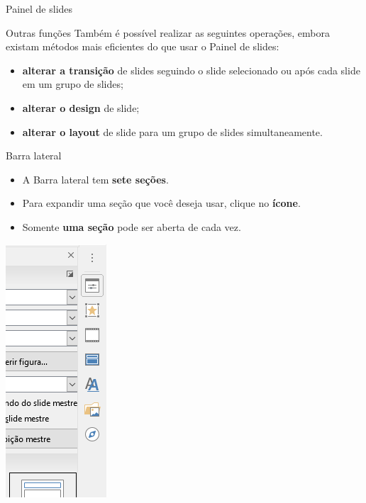 \begin{frame}{Painel de slides}
	\begin{block}{Outras funções}
		Também é possível realizar as seguintes operações, embora existam métodos mais eficientes do que usar o Painel de slides:
		\begin{itemize}
			\item \textbf{alterar a transição} de slides seguindo o slide selecionado ou após cada slide em um grupo de slides;
			\item \textbf{alterar o design} de slide;
			\item \textbf{alterar o layout} de slide para um grupo de slides simultaneamente.
		\end{itemize}
	\end{block}
\end{frame}


\begin{frame}{Barra lateral}
	\begin{block}{}
		\begin{itemize}
			\item A Barra lateral tem \textbf{sete seções}.
			\item Para expandir uma seção que você deseja usar, clique no \textbf{ícone}.
			\item Somente \textbf{uma seção} pode ser aberta de cada vez.
		\end{itemize}
	\end{block}

	\centering
	\includegraphics[width=0.19\linewidth]{Figuras/Ch05/fig9}
\end{frame}


